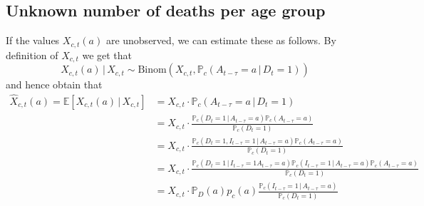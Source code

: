\documentclass[a4paper]{article}
\renewcommand\P{\mathbb{P}}
\newcommand\E{\mathbb{E}}
\newcommand{\given}{\, \vert \,}
\begin{document}
{\subsection{Unknown number of deaths per age group}
%
If the values $X_{c,t}(a)$ are unobserved, we can estimate these as follows. By definition of $X_{c,t}$ we get that
$$X_{c,t}(a) \given X_{c,t} \sim \text{Binom}(X_{c,t}, \P_c(A_{t-\tau} = a \given D_{t} = 1))$$
and hence obtain that
\begin{align*}
\hat{X}_{c,t}(a) = \E[X_{c,t}(a) \given X_{c,t}] 	&= X_{c,t} \cdot \P_c(A_{t-\tau} = a \given D_{t} = 1) \\
																		&= X_{c,t} \cdot \frac{\P_c(D_t = 1 \given A_{t-\tau} = a) \P_c(A_{t-\tau} = a)}{\P_c(D_t = 1)} \\
																		&= X_{c,t} \cdot \frac{\P_c(D_t = 1, I_{t-\tau} = 1 \given A_{t-\tau} = a) \P_c(A_{t-\tau} = a)}{\P_c(D_t = 1)} \\
																		&= X_{c,t} \cdot \frac{\P_c(D_t = 1\given I_{t-\tau} = 1 A_{t-\tau} = a) \P_c(I_{t-\tau} = 1 \given A_{t-\tau} = a) \P_c(A_{t-\tau} = a)}{\P_c(D_t = 1)} \\
																		&= X_{c,t} \cdot \P_D(a) p_c(a) \frac{\P_c(I_{t-\tau} = 1 \given A_{t-\tau} = a) }{\P_c(D_t = 1)} \\
\end{align*}
}
\fi
\end{document}
